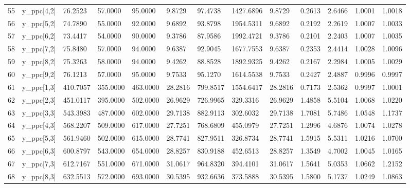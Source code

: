 \begin{table}[ht]
\begin{tabular}{rllllllllllll}
  55 & y\_ppc[4,2] &   76.2523 &   57.0000 &   95.0000 &    9.8729 &      97.4738 & 1427.6896 &    9.8729 &  0.2613 &  2.6466 & 1.0001 & 1.0018 \\ 
  56 & y\_ppc[5,2] &   74.7890 &   55.0000 &   92.0000 &    9.6892 &      93.8798 & 1954.5311 &    9.6892 &  0.2192 &  2.2619 & 1.0007 & 1.0033 \\ 
  57 & y\_ppc[6,2] &   73.4417 &   54.0000 &   90.0000 &    9.3786 &      87.9586 & 1992.4721 &    9.3786 &  0.2101 &  2.2403 & 1.0007 & 1.0035 \\ 
  58 & y\_ppc[7,2] &   75.8480 &   57.0000 &   94.0000 &    9.6387 &      92.9045 & 1677.7553 &    9.6387 &  0.2353 &  2.4414 & 1.0028 & 1.0096 \\ 
  59 & y\_ppc[8,2] &   75.3263 &   58.0000 &   94.0000 &    9.4262 &      88.8528 & 1892.9325 &    9.4262 &  0.2167 &  2.2984 & 1.0005 & 1.0029 \\ 
  60 & y\_ppc[9,2] &   76.1213 &   57.0000 &   95.0000 &    9.7533 &      95.1270 & 1614.5538 &    9.7533 &  0.2427 &  2.4887 & 0.9996 & 0.9997 \\ 
  61 & y\_ppc[1,3] &  410.7057 &  355.0000 &  463.0000 &   28.2816 &     799.8517 & 1554.6417 &   28.2816 &  0.7173 &  2.5362 & 0.9997 & 1.0001 \\ 
  62 & y\_ppc[2,3] &  451.0117 &  395.0000 &  502.0000 &   26.9629 &     726.9965 &  329.3316 &   26.9629 &  1.4858 &  5.5104 & 1.0068 & 1.0220 \\ 
  63 & y\_ppc[3,3] &  543.3983 &  487.0000 &  602.0000 &   29.7138 &     882.9113 &  302.6032 &   29.7138 &  1.7081 &  5.7486 & 1.0548 & 1.1737 \\ 
  64 & y\_ppc[4,3] &  568.2207 &  509.0000 &  617.0000 &   27.7251 &     768.6809 &  455.0979 &   27.7251 &  1.2996 &  4.6876 & 1.0074 & 1.0278 \\ 
  65 & y\_ppc[5,3] &  561.9460 &  502.0000 &  615.0000 &   28.7741 &     827.9511 &  326.8734 &   28.7741 &  1.5915 &  5.5311 & 1.0216 & 1.0700 \\ 
  66 & y\_ppc[6,3] &  600.8797 &  543.0000 &  654.0000 &   28.8257 &     830.9188 &  452.6513 &   28.8257 &  1.3549 &  4.7002 & 1.0045 & 1.0165 \\ 
  67 & y\_ppc[7,3] &  612.7167 &  551.0000 &  671.0000 &   31.0617 &     964.8320 &  394.4101 &   31.0617 &  1.5641 &  5.0353 & 1.0662 & 1.2152 \\ 
  68 & y\_ppc[8,3] &  632.5513 &  572.0000 &  693.0000 &   30.5395 &     932.6636 &  373.5888 &   30.5395 &  1.5800 &  5.1737 & 1.0249 & 1.0863 \\ 

\end{tabular}
\end{table}

